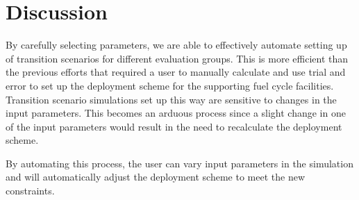 \section{Discussion}

By carefully selecting \deploy parameters, we are able to 
effectively automate setting up of transition scenarios for 
different evaluation groups. 
This is more efficient than the previous efforts that
required a user to manually calculate and use trial and error 
to set up the deployment scheme for the supporting fuel cycle 
facilities. 
Transition scenario simulations set up this way are sensitive 
to changes in the input parameters. 
This becomes an arduous process since a slight change in one 
of the input parameters would result in the need to recalculate 
the deployment scheme.  

By automating this process, the user can vary input parameters 
in the simulation and \deploy will automatically adjust the
deployment scheme to meet the new constraints. 